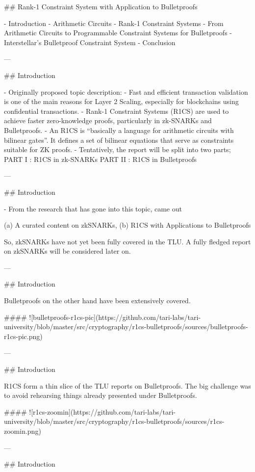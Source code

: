 ## Rank-1 Constraint System with Application to Bulletproofs


- Introduction
- Arithmetic Circuits
- Rank-1 Constraint Systems
- From Arithmetic Circuits to Programmable Constraint Systems for Bulletproofs 
- Interstellar's Bulletproof Constraint System
- Conclusion

---

## Introduction

- Originally proposed topic description: 
  - Fast and efficient transaction validation is one of the main reasons for Layer 2 Scaling, especially for blockchains using confidential transactions.  
  - Rank-1 Constraint Systems (R1CS) are used to achieve faster zero-knowledge proofs, particularly in zk-SNARKs and Bulletproofs. 
  - An R1CS is “basically a language for arithmetic circuits with bilinear gates”. It defines a set of bilinear equations that serve as constraints suitable for ZK proofs. 
  - Tentatively, the report will be split into two parts; 
    PART I    :  R1CS in zk-SNARKs  
    PART II   :  R1CS in Bulletproofs 

--- 

## Introduction

- From the research that has gone into this topic, came out 

(a) A curated content on zkSNARKs, 
(b) R1CS with Applications to Bulletproofs  

So, zkSNARKs have not yet been fully covered in the TLU. 
A fully fledged report on zkSNARKs will be considered later on. 

--- 

## Introduction

Bulletproofs on the other hand have been extensively covered. 

#### ![bulletproofs-r1cs-pic](https://github.com/tari-labs/tari-university/blob/master/src/cryptography/r1cs-bulletproofs/sources/bulletproofs-r1cs-pic.png)

 
--- 

## Introduction 

R1CS form a thin slice of the TLU reports on Bulletproofs. 
The big challenge was to avoid rehearsing things already presented under Bulletproofs. 

#### ![r1cs-zoomin](https://github.com/tari-labs/tari-university/blob/master/src/cryptography/r1cs-bulletproofs/sources/r1cs-zoomin.png)


--- 

## Introduction

